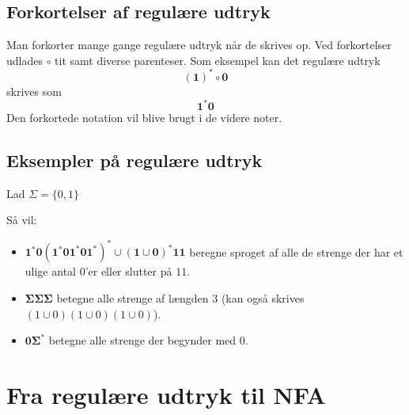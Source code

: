 \documentclass[a4paper,10pt,article]{memoir}
\begin{document}
\section{Forkortelser af regulære udtryk}

Man forkorter mange gange regulære udtryk når de skrives op.
Ved forkortelser udlades $\circ$ tit samt diverse parenteser.
Som eksempel kan det regulære udtryk
%
\[ \mathbf{(1)^*\circ 0} \]
%
skrives som
%
\[ \mathbf{1^*0 }\]
Den forkortede notation vil blive brugt i de videre noter.

\section{Eksempler på regulære udtryk}

Lad $\Sigma = \{0,1\}$

Så vil:
\begin{itemize}
\item $\mathbf{1^*0(1^*01^*01^*)^*  \cup (1 \cup 0)^*11}$ beregne sproget af alle de strenge der har et ulige antal $0$'er eller slutter på $11$.
\item $\mathbf{\Sigma \Sigma \Sigma} $ betegne alle strenge af længden 3 (kan også skrives $(1 \cup 0)(1 \cup 0)(1 \cup 0)$).
\item $\mathbf{0 \Sigma^*}$ betegne alle strenge der begynder med $0$.
\end{itemize}

\chapter{Fra regulære udtryk til NFA}
\end{document}
